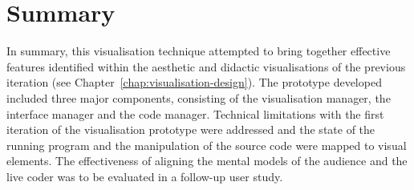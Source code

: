 







\section{Summary}

In summary, this visualisation technique attempted to bring together effective features identified within the aesthetic and didactic visualisations of the previous iteration (see Chapter~\ref{chap:visualisation-design}). The prototype developed included three major components, consisting of the visualisation manager, the interface manager and the code manager. Technical limitations with the first iteration of the visualisation prototype were addressed and the state of the running program and the manipulation of the source code were mapped to visual elements. The effectiveness of aligning the mental models of the audience and the live coder was to be evaluated in a follow-up user study.


